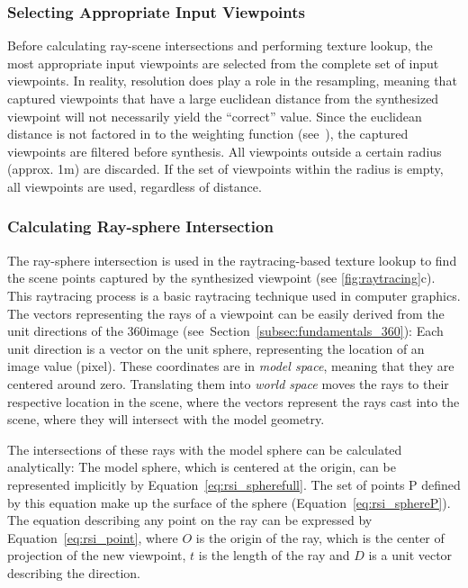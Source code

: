 \subsubsection{Selecting Appropriate Input Viewpoints}
Before calculating ray-scene intersections and performing texture lookup, the most appropriate input viewpoints are selected from the complete set of input viewpoints. In reality, resolution does play a role in the resampling, meaning that captured viewpoints that have a large euclidean distance from the synthesized viewpoint will not necessarily yield the ``correct'' value. Since the euclidean distance is not factored in to the weighting function (see~\pageref{misc:input_selection}), the captured viewpoints are filtered before synthesis. All viewpoints outside a certain radius (approx. 1m) are discarded. If the set of viewpoints within the radius is empty, all viewpoints are used, regardless of distance.

\subsubsection{Calculating Ray-sphere Intersection}
The ray-sphere intersection is used in the raytracing-based texture lookup to find the scene points captured by the synthesized viewpoint (see \ref{fig:raytracing}c). This raytracing process is a basic raytracing technique used in computer graphics. The vectors representing the rays of a viewpoint can be easily derived from the unit directions of the 360\degree image (see~Section~\ref{subsec:fundamentals_360}): Each unit direction is a vector on the unit sphere, representing the location of an image value (pixel). These coordinates are in \emph{model space}, meaning that they are centered around zero. Translating them into \emph{world space} moves the rays to their respective location in the scene, where the vectors represent the rays cast into the scene, where they will intersect with the model geometry.

The intersections of these rays with the model sphere can be calculated analytically: The model sphere, which is centered at the origin, can be represented implicitly by Equation~\ref{eq:rsi_spherefull}. The set of points P defined by this equation make up the surface of the sphere (Equation~\ref{eq:rsi_sphereP}). 
The equation describing any point on the ray can be expressed by Equation~\ref{eq:rsi_point}, where $O$ is the origin of the ray, which is the center of projection of the new viewpoint, $t$ is the length of the ray and $D$ is a unit vector describing the direction. 

